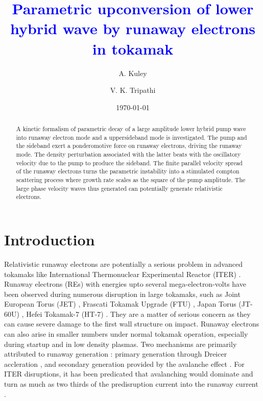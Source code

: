 \documentclass[aip,pop,amsmath,amssymb,showpacs,reprint,floatfix,lengthcheck]{revtex4-1}
\begin{document}

\title{\textcolor{blue}{Parametric upconversion of lower hybrid wave by runaway electrons in tokamak}}%


\author{A. Kuley}
\author{V. K. Tripathi}
\date{\today}%

\begin{abstract}
A  kinetic formalism of parametric decay of a large amplitude lower hybrid pump wave into runaway electron mode and a uppersideband mode is investigated. The pump and the sideband exert a ponderomotive force on runaway electrons, driving the runaway mode. The density perturbation associated with the latter beats with the oscillatory velocity due to the pump to produce the sideband. The finite parallel velocity spread of the runaway electrons turns the parametric instability into a stimulated compton scattering process where growth rate scales as the square of the pump amplitude. The large phase velocity waves thus generated can potentially generate relativistic electrons.

\end{abstract}


\maketitle

\section{Introduction}
Relativistic runaway electrons are potentially a serious problem in advanced tokamaks like International Thermonuclear Experimental Reactor (ITER) \cite{helander2002runaway,shimada2007overview}. Runaway electrons (REs) with energies upto several mega-electron-volts have been observed during numerous disruption in large tokamaks, such as Joint European Torus (JET) \cite{wesson1989disruptions,gill2002behaviour,riccardo2003disruptions,plyusnin2006study}, Frascati Tokamak Upgrade (FTU) \cite{PhysRevLett.97.165002,martin2004runaway}, Japan Torus (JT-60U) \cite{yoshino2000runaway,kawano2002disruption}, Hefei Tokamak-7 (HT-7) \cite{chen2006dynamics,chen2007enhancement}. They are a matter of serious concern as they can cause severe damage to the first wall structure on impact. Runaway electrons can also arise in smaller numbers under normal tokamak operation, especially during startup and in low density plasmas. Two mechanisms are primarily attributed to runaway generation : primary generation through Dreicer accleration \cite{PhysRev.117.329}, and secondary generation provided by the avalanche effect \cite{rosenbluth1997theory}. For ITER disruptions, it has been predicated that avalanching would dominate and turn as much as two thirds of the predisruption current into the runaway current \cite{PhysRevLett.92.205004}.
\end{document}
